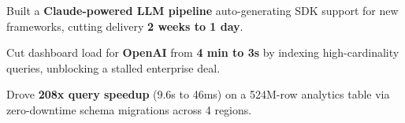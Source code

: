 \documentclass[letterpaper,10pt]{article}
\newcommand{\resumeItem}[1]{
  \item\small{
    #1 \vspace{-3pt}
  }
}
\begin{document}
\resumeItem{Built a \textbf{Claude-powered LLM pipeline} auto-generating SDK support for new frameworks, cutting delivery \textbf{2 weeks to 1 day}.}
\resumeItem{Cut dashboard load for \textbf{OpenAI} from \textbf{4 min to 3s} by indexing high-cardinality queries, unblocking a stalled enterprise deal.}
\resumeItem{Drove \textbf{208x query speedup} (9.6s to 46ms) on a 524M-row analytics table via zero-downtime schema migrations across 4 regions.}
\end{document}
